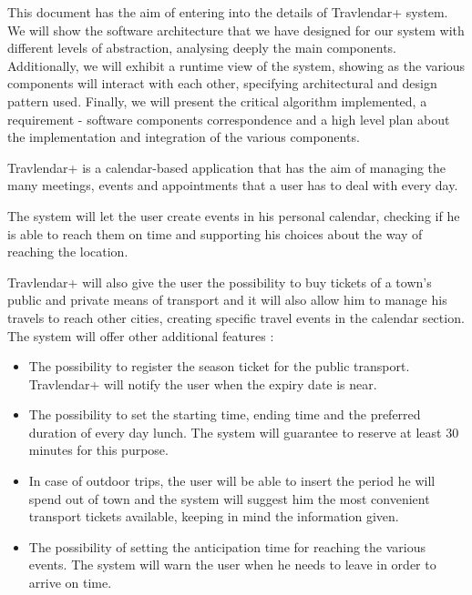 \vspace*{-5mm}

This document has the aim of entering into the details of Travlendar+ system. 
We will show the software architecture that we have designed for our system with different levels of abstraction, analysing deeply the main components. 
Additionally, we will exhibit a runtime view of the system, showing as the various components will interact with each other, specifying architectural and design pattern used.
Finally, we will present the critical algorithm implemented, a requirement - software components correspondence and a high level plan about the implementation and integration of the various components.

Travlendar+ is a calendar-based application that has the aim of managing the many meetings, events and appointments that a user has to deal with every day.\par
The system will let the user create events in his personal calendar, checking if he is able to reach them on time and supporting his choices about the way of reaching the location. \par
Travlendar+ will also give the user the possibility to buy tickets of a town’s public and private means of transport and it will also allow him to manage his travels to reach other cities, creating specific travel events in the calendar section.
The system will offer other additional features :
\begin{itemize}
	\setlength{\leftskip}{0.5cm}
	\item The possibility to register the season ticket for the public transport. Travlendar+ will notify the user when the expiry date is near.
	\item The possibility to set the starting time, ending time and the preferred duration of every day lunch. The system will guarantee to reserve at least 30 minutes for this purpose.
	\item In case of outdoor trips, the user will be able to insert the period he will spend out of town and the system will suggest him the most convenient transport tickets available, keeping in mind the information given.
	\item The possibility of setting the anticipation time for reaching the various events. The system will warn the user when he needs to leave in order to arrive on time.
\end{itemize}

